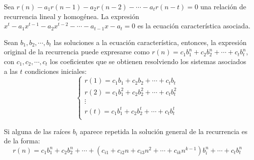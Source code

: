 \documentclass[a4paper]{article}
\begin{document}
Sea $r(n) - a_1r(n-1)-a_2r(n-2)-\cdots-a_tr(n-t)=0$ una relación de recurrencia lineal y homogénea. La expresión $x^t-a_1x^{t-1}-a_2x^{t-2}-\cdots-a_{t-1}x-a_t = 0$ es la ecuación característica asociada.

Sean $b_1, b_2, \cdots, b_t$ las soluciones a la ecuación característica, entonces, la expresión original de la recurrencia puede expresarse como $r(n) = c_1b_1^n + c_2b_2^n+\cdots+c_tb_t^n$, con $c_1, c_2, \cdots, c_t$ los coeficientes que se obtienen resolviendo los sistemas asociados a las $t$ condiciones iniciales:
$$
\begin{cases}
	r(1) = c_1b_1 + c_2b_2+\cdots+c_tb_t\\
	r(2) = c_1b_1^2 + c_2b_2^2+\cdots+c_tb_t^2\\
	\vdots\\
	r(t) = c_1b_1^t + c_2b_2^t+\cdots+c_tb_t^t\\
\end{cases}
$$

Si alguna de las raíces $b_i$ aparece repetida la solución general de la recurrencia es de la forma:
$$r(n) = c_1b_1^n + c_2b_2^n+\cdots+(c_{i1}+c_{i2}n+c_{i3}n^2+\cdots+c_{ik}n^{k-1})b_i^n+\cdots+c_tb_t^n$$
\end{document}
